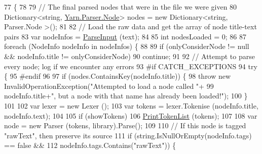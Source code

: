 \begin{DoxyCode}
77                                                                                                            
                                                            \{
78 
79             \textcolor{comment}{// The final parsed nodes that were in the file we were given}
80             Dictionary<string, \hyperlink{a00068}{Yarn.Parser.Node}> nodes = \textcolor{keyword}{new} Dictionary<string, Parser.Node
      >();
81 
82             \textcolor{comment}{// Load the raw data and get the array of node title-text pairs}
83             var nodeInfos = \hyperlink{a00065_a2f635405d2b624ac67a27da0787a3524}{ParseInput} (text);
84 
85             \textcolor{keywordtype}{int} nodesLoaded = 0;
86 
87             \textcolor{keywordflow}{foreach} (NodeInfo nodeInfo \textcolor{keywordflow}{in} nodeInfos) \{
88 
89                 \textcolor{keywordflow}{if} (onlyConsiderNode != null && nodeInfo.title != onlyConsiderNode)
90                     \textcolor{keywordflow}{continue};
91 
92                 \textcolor{comment}{// Attempt to parse every node; log if we encounter any errors}
93 \textcolor{preprocessor}{                #if CATCH\_EXCEPTIONS}
94 \textcolor{preprocessor}{}                \textcolor{keywordflow}{try} \{
95 \textcolor{preprocessor}{                #endif }
96 \textcolor{preprocessor}{}                    
97                     \textcolor{keywordflow}{if} (nodes.ContainsKey(nodeInfo.title)) \{
98                         \textcolor{keywordflow}{throw} \textcolor{keyword}{new} InvalidOperationException(\textcolor{stringliteral}{"Attempted to load a node called "}+
99                             nodeInfo.title+\textcolor{stringliteral}{", but a node with that name has already been loaded!"});
100                     \}
101 
102                     var lexer = \textcolor{keyword}{new} Lexer ();
103                     var tokens = lexer.Tokenise (nodeInfo.title, nodeInfo.text);
104 
105                     \textcolor{keywordflow}{if} (showTokens)
106                         \hyperlink{a00065_a9321fce224021841ce6f70ca7fbe531b}{PrintTokenList} (tokens);
107 
108                     var node = \textcolor{keyword}{new} Parser (tokens, library).Parse();
109 
110                     \textcolor{comment}{// If this node is tagged "rawText", then preserve its source}
111                     \textcolor{keywordflow}{if} (\textcolor{keywordtype}{string}.IsNullOrEmpty(nodeInfo.tags) == \textcolor{keyword}{false} && 
112                         nodeInfo.tags.Contains(\textcolor{stringliteral}{"rawText"})) \{

\end{DoxyCode}
